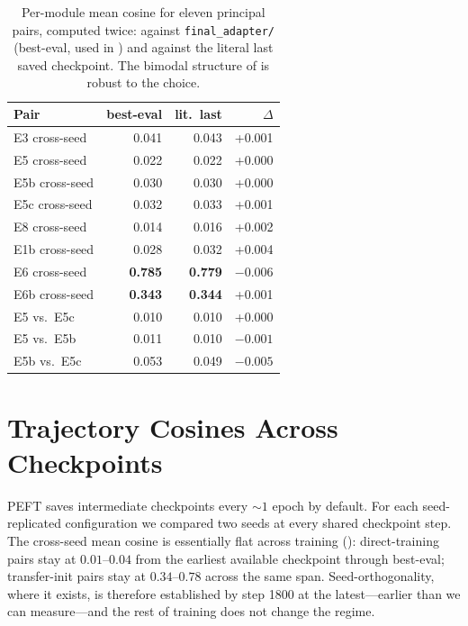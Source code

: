 \documentclass[11pt]{article}
\begin{document}
\begin{table}[h]
\centering
\small
\begin{tabular}{lrrr}
\toprule
\textbf{Pair} & \textbf{best-eval} & \textbf{lit.\ last} & \textbf{$\Delta$} \\
\midrule
E3 cross-seed       & 0.041 & 0.043 & +0.001 \\
E5 cross-seed       & 0.022 & 0.022 & +0.000 \\
E5b cross-seed      & 0.030 & 0.030 & +0.000 \\
E5c cross-seed      & 0.032 & 0.033 & +0.001 \\
E8 cross-seed       & 0.014 & 0.016 & +0.002 \\
E1b cross-seed      & 0.028 & 0.032 & +0.004 \\
E6 cross-seed       & \textbf{0.785} & \textbf{0.779} & $-0.006$ \\
E6b cross-seed      & \textbf{0.343} & \textbf{0.344} & +0.001 \\
E5 vs.\ E5c         & 0.010 & 0.010 & +0.000 \\
E5 vs.\ E5b         & 0.011 & 0.010 & $-0.001$ \\
E5b vs.\ E5c        & 0.053 & 0.049 & $-0.005$ \\
\bottomrule
\end{tabular}
\caption{Per-module mean cosine for eleven principal pairs, computed twice: against \texttt{final\_adapter/} (best-eval, used in ) and against the literal last saved checkpoint. The bimodal structure of  is robust to the choice.}
\label{tab:lastckpt}
\end{table}

\section{Trajectory Cosines Across Checkpoints}
\label{app:trajectory}

PEFT saves intermediate checkpoints every $\sim 1$ epoch by default. For each seed-replicated configuration we compared two seeds at every shared checkpoint step. The cross-seed mean cosine is essentially flat across training (): direct-training pairs stay at $0.01$--$0.04$ from the earliest available checkpoint through best-eval; transfer-init pairs stay at $0.34$--$0.78$ across the same span. Seed-orthogonality, where it exists, is therefore established by step 1800 at the latest---earlier than we can measure---and the rest of training does not change the regime.
\end{document}
